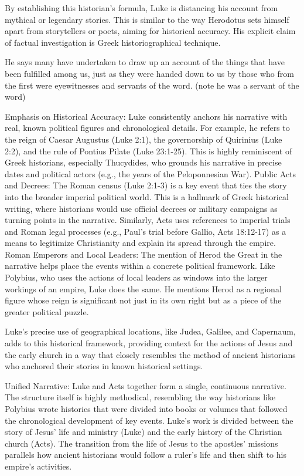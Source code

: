 By establishing this historian's formula, Luke is distancing his account from mythical or legendary stories.
This is similar to the way Herodotus sets himself apart from storytellers or poets, aiming for historical accuracy.
His explicit claim of factual investigation is Greek historiographical technique.

He says many have undertaken to draw up an account of the things that have been fulfilled among us, just as they were handed down to us by those who from the first were eyewitnesses and servants of the word.
(note he was a servant of the word)

Emphasis on Historical Accuracy: Luke consistently anchors his narrative with real, known political figures and chronological details.
For example, he refers to the reign of Caesar Augustus (Luke 2:1), the governorship of Quirinius (Luke 2:2), and the rule of Pontius Pilate (Luke 23:1-25).
This is highly reminiscent of Greek historians, especially Thucydides, who grounds his narrative in precise dates and political actors (e.g., the years of the Peloponnesian War).
Public Acts and Decrees: The Roman census (Luke 2:1-3) is a key event that ties the story into the broader imperial political world.
This is a hallmark of Greek historical writing, where historians would use official decrees or military campaigns as turning points in the narrative.
Similarly, Acts uses references to imperial trials and Roman legal processes (e.g., Paul's trial before Gallio, Acts 18:12-17) as a means to legitimize Christianity and explain its spread through the empire.
Roman Emperors and Local Leaders: The mention of Herod the Great in the narrative helps place the events within a concrete political framework.
Like Polybius, who uses the actions of local leaders as windows into the larger workings of an empire, Luke does the same.
He mentions Herod as a regional figure whose reign is significant not just in its own right but as a piece of the greater political puzzle.

Luke's precise use of geographical locations, like Judea, Galilee, and Capernaum, adds to this historical framework, providing context for the actions of Jesus and the early church in a way that closely resembles the method of ancient historians who anchored their stories in known historical settings.

Unified Narrative: Luke and Acts together form a single, continuous narrative.
The structure itself is highly methodical, resembling the way historians like Polybius wrote histories that were divided into books or volumes that followed the chronological development of key events.
Luke's work is divided between the story of Jesus' life and ministry (Luke) and the early history of the Christian church (Acts).
The transition from the life of Jesus to the apostles' missions parallels how ancient historians would follow a ruler's life and then shift to his empire's activities.

